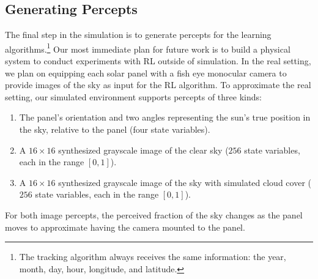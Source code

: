 \documentclass{article}
\begin{document}
{%
\subsection{Generating Percepts}

The final step in the simulation is to generate percepts for the learning algorithms.\footnote{The tracking algorithm always receives the same information: the year, month, day, hour, longitude, and latitude.} Our most immediate plan for future work is to build a physical system to conduct experiments with RL outside of simulation. In the real setting, we plan on equipping each solar panel with a fish eye monocular camera to provide images of the sky as input for the RL algorithm. To approximate the real setting, our simulated environment supports percepts of three kinds:
\begin{enumerate}
\item The panel's orientation and two angles representing the sun's true position in the sky, relative to the panel (four state variables).
\item A $16 \times 16$ synthesized grayscale image of the clear sky ($256$ state variables, each in the range $[0,1]$).
\item A $16\times 16$ synthesized grayscale image of the sky with simulated cloud cover ($256$ state variables, each in the range $[0,1]$).
\end{enumerate}
For both image percepts, the perceived fraction of the sky changes as the panel moves to approximate having the camera mounted to the panel.


}
\end{document}
